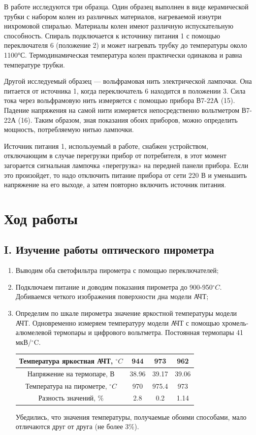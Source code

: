 \documentclass[a4paper,12pt]{article}
\begin{document}
В работе исследуются три образца. Один образец выполнен в виде керамической трубки с набором колен из различных материалов, нагреваемой изнутри нихромовой спиралью. Материалы колен имеют различную испускательную способность. Спираль подключается к источнику питания 1 с помощью переключателя 6 (положение 2) и может нагревать трубку до температуры около 1100°С. Термодинамическая температура колен практически одинакова и равна температуре трубки.

Другой исследуемый образец — вольфрамовая нить электрической лампочки. Она питается от источника 1, когда переключатель 6 находится в положении 3. Сила тока через вольфрамовую нить измеряется с помощью прибора В7-22А (15). Падение напряжения на самой нити измеряется непосредственно вольтметром В7-22А (16). Таким образом, зная показания обоих приборов, можно определить мощность, потребляемую нитью лампочки.

Источник питания 1, используемый в работе, снабжен устройством, отключающим в случае перегрузки прибор от потребителя, в этот момент загорается сигнальная лампочка «перегрузка» на передней панели прибора. Если это произойдет, то надо отключить питание прибора от сети 220 В и уменьшить напряжение на его выходе, а затем повторно включить источник питания.

\section{Ход работы}
\subsection{I. Изучение работы оптического пирометра}
\begin{enumerate}
    \item Выводим оба светофильтра пирометра с помощью переключателей;
    \item Подключаем питание и доводим показания пирометра до 900-950$^\circ C$. Добиваемся четкого изображения поверхности дна модели АЧТ;
    \item Определим по шкале пирометра значение яркостной температуры модели АЧТ. Одновременно измеряем температуру модели АЧТ с помощью хромель-алюмелевой термопары и цифрового вольтметра. Постоянная термопары 41 мкВ/$^\circ$C.

    \begin{table}[h!]
    \centering
    \begin{tabular}{||c||c|c|c||}
    \hline
    Температура яркостная АЧТ, $^\circ C$ & 944 & 973 & 962 \\
    \hline
    Напряжение на термопаре, В & 38.96 & 39.17 & 39.06 \\
    \hline
    Температура на пирометре, $^\circ C$ & 970 & 975.4 & 973 \\
    \hline
    Разность значений, $\%$ & 2.8 & 0.2 & 1.14 \\
    \hline
    \end{tabular}
    \end{table}

    Убедились, что значения температуры, получаемые обоими способами, мало отличаются друг от друга (не более 3$\%$).
\end{enumerate}
\end{document}
